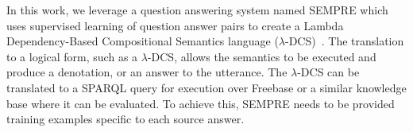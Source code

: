 In this work, we leverage a question answering system named SEMPRE which uses supervised
learning of question answer pairs to create a Lambda Dependency-Based
Compositional Semantics language (\(\lambda\)-DCS)~\cite{berant2013semantic}.
The translation to a logical form, such as a \(\lambda\)-DCS, allows the
semantics to be executed and produce a denotation, or an answer to the utterance.
The \(\lambda\)-DCS can be translated to a SPARQL query for execution over 
Freebase or a similar knowledge base where it can be evaluated.
To achieve this, SEMPRE needs to be provided training examples specific to each source answer.




